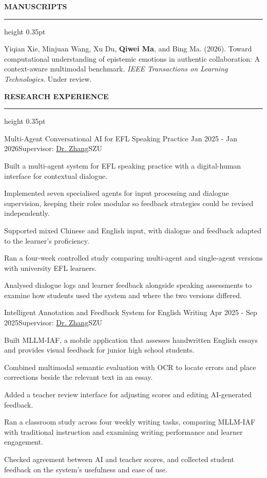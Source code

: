 \documentclass{resume} %
\renewenvironment{rSection}[1]{
  \sectionskip
  \textbf{\MakeUppercase{#1}}
  \sectionlineskip
  {\color[gray]{0.6}\hrule height 0.35pt}
  \begin{list}{}{
  \setlength{\leftmargin}{1.5em}
  \setlength{\topsep}{4pt}
  \setlength{\partopsep}{0pt}
  }
  \item[]\RaggedRight\hyphenpenalty=10000\relax
  }{
  \end{list}
  }
\begin{document}
  \begin{rSection}{Manuscripts}
  \begingroup\fontsize{10.5}{12.8}\selectfont\RaggedRight{}\relax
  Yiqian Xie, Minjuan Wang, Xu Du, \textbf{Qiwei Ma}, and Bing Ma. (2026).
  Toward computational understanding of epistemic emotions in authentic collaboration:
  A context-aware multimodal benchmark. \emph{IEEE Transactions on Learning Technologies}.
  Under review.
  \par\endgroup
  \end{rSection}

  \begin{rSection}{Research Experience}

  \begin{rSubsection}{Multi-Agent Conversational AI for EFL Speaking Practice \cite{paper1}}{Jan
  2025 - Jan 2026}{Supervisor: \href{https://fe.szu.edu.cn/info/1023/1133.htm}{Dr. Zhang}}{SZU}
  \item Built a multi-agent system for EFL speaking practice with a digital-human interface
  for contextual dialogue.
  \item Implemented seven specialised agents for input processing and dialogue supervision,
  keeping their roles modular so feedback strategies could be revised independently.
  \item Supported mixed Chinese and English input, with dialogue and feedback adapted to
  the learner's proficiency.
  \item Ran a four-week controlled study comparing multi-agent and single-agent versions
  with university EFL learners.
  \item Analysed dialogue logs and learner feedback alongside speaking assessments to examine
  how students used the system and where the two versions differed.
  \end{rSubsection}

  \begin{rSubsection}{Intelligent Annotation and Feedback System for English Writing \cite{paper4}}
  {Apr 2025 - Sep 2025}{Supervisor: \href{https://fe.szu.edu.cn/info/1023/1133.htm}{Dr. Zhang}}{SZU}
  \item Built MLLM-IAF, a mobile application that assesses handwritten English essays and
  provides visual feedback for junior high school students.
  \item Combined multimodal semantic evaluation with OCR to locate errors and place
  corrections beside the relevant text in an essay.
  \item Added a teacher review interface for adjusting scores and editing AI-generated
  feedback.
  \item Ran a classroom study across four weekly writing tasks, comparing MLLM-IAF with
  traditional instruction and examining writing performance and learner engagement.
  \item Checked agreement between AI and teacher scores, and collected student feedback
  on the system's usefulness and ease of use.
  \end{rSubsection}

  \end{rSection}
\end{document}
